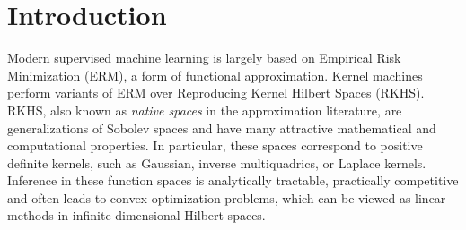 \documentclass[final,12pt]{colt2018}
\begin{document}
\begin{abstract}





\end{abstract}


\section{Introduction}


Modern supervised machine learning is largely based on Empirical Risk Minimization (ERM), a form of functional approximation. 
Kernel machines perform variants of ERM over Reproducing Kernel Hilbert Spaces (RKHS). RKHS, also known as {\it native spaces} in the approximation literature, are generalizations of Sobolev spaces and have many attractive mathematical and computational properties.  In particular, these spaces
 correspond to positive definite kernels, such as Gaussian, inverse multiquadrics, or Laplace kernels. Inference in these function spaces is analytically tractable, practically competitive  and often leads to  convex optimization problems, which can be viewed as linear methods in infinite dimensional Hilbert spaces. 
 
 
% 
\end{document}
